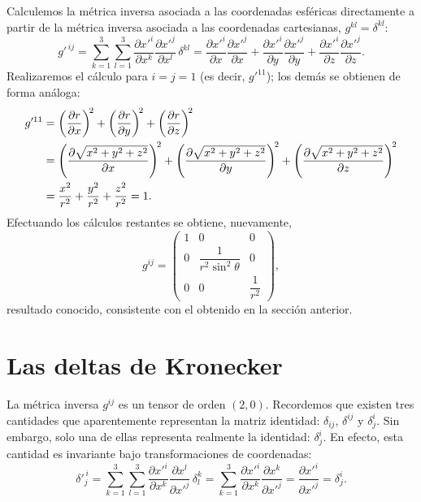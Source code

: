 Calculemos la métrica inversa asociada a las coordenadas esféricas directamente a partir de la métrica inversa asociada a las coordenadas cartesianas, $g^{kl}=\delta^{kl}$:
\begin{equation}
g'^{\,ij} = \sum_{k=1}^3\sum_{l=1}^3\frac{\partial x'^i}{\partial x^k}\frac{\partial x'^j}{\partial x^l}\,\delta^{kl}
= \frac{\partial x'^i}{\partial x}\frac{\partial x'^j}{\partial x} + \frac{\partial x'^i}{\partial y}\frac{\partial x'^j}{\partial y} + \frac{\partial x'^i}{\partial z}\frac{\partial x'^j}{\partial z} .
\end{equation}
Realizaremos el cálculo para $i=j=1$ (es decir, $g'^{11}$); los demás se obtienen de forma análoga:
\begin{align}
g'^{11} &= \left(\frac{\partial r}{\partial x}\right)^{\!2} + \left(\frac{\partial r}{\partial y}\right)^{\!2} + \left(\frac{\partial r}{\partial z}\right)^{\!2} \notag \\
&= \left(\frac{\partial \sqrt{x^2+y^2+z^2}}{\partial x}\right)^{\!2} + \left(\frac{\partial \sqrt{x^2+y^2+z^2}}{\partial y}\right)^{\!2} + \left(\frac{\partial \sqrt{x^2+y^2+z^2}}{\partial z}\right)^{\!2} \notag \\
&= \frac{x^2}{r^2} + \frac{y^2}{r^2} + \frac{z^2}{r^2} = 1 .
\end{align}
Efectuando los cálculos restantes se obtiene, nuevamente,
\begin{equation}
g^{ij} =
\begin{pmatrix}
1 & 0 & 0 \\
0 & \dfrac{1}{r^2\sin^2\theta} & 0 \\[6pt]
0 & 0 & \dfrac{1}{r^2}
\end{pmatrix},
\end{equation}
resultado conocido, consistente con el obtenido en la sección anterior.

\section{Las deltas de Kronecker}

La métrica inversa $g^{ij}$ es un tensor de orden $(2,0)$. Recordemos que existen tres cantidades que aparentemente representan la matriz identidad: $\delta_{ij}$, $\delta^{ij}$ y $\delta^i_j$. Sin embargo, solo una de ellas representa realmente la identidad: $\delta^i_j$. En efecto, esta cantidad es invariante bajo transformaciones de coordenadas:
\begin{equation}
\delta'^{\,i}_j = \sum_{k=1}^3\sum_{l=1}^3 \frac{\partial x'^i}{\partial x^k}\frac{\partial x^l}{\partial x'^j}\,\delta^k_l
= \sum_{k=1}^3 \frac{\partial x'^i}{\partial x^k}\frac{\partial x^k}{\partial x'^j}
= \frac{\partial x'^i}{\partial x'^j} = \delta^i_j .
\end{equation}


